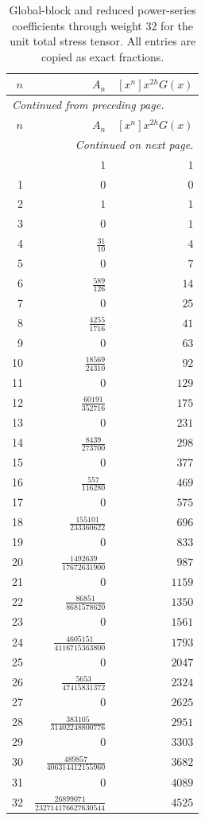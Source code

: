 \begingroup\small
\setlength{\tabcolsep}{5pt}
\begin{longtable}{rrr}
\caption{Global-block and reduced power-series coefficients through weight 32 for the unit total stress tensor. All entries are copied as exact fractions.}\label{expphysics:blocks-unit_total_stress}\\
\toprule
$n$ & $A_n$ & $[x^n]x^{2h}G(x)$\\
\midrule
\endfirsthead
\multicolumn{3}{l}{\small\itshape Continued from preceding page.}\\
\toprule
$n$ & $A_n$ & $[x^n]x^{2h}G(x)$\\
\midrule
\endhead
\midrule
\multicolumn{3}{r}{\small\itshape Continued on next page.}\\
\endfoot
\bottomrule
\endlastfoot
0 & $1$ & $1$\\
1 & $0$ & $0$\\
2 & $1$ & $1$\\
3 & $0$ & $1$\\
4 & $\frac{31}{10}$ & $4$\\
5 & $0$ & $7$\\
6 & $\frac{589}{126}$ & $14$\\
7 & $0$ & $25$\\
8 & $\frac{4255}{1716}$ & $41$\\
9 & $0$ & $63$\\
10 & $\frac{18569}{24310}$ & $92$\\
11 & $0$ & $129$\\
12 & $\frac{60191}{352716}$ & $175$\\
13 & $0$ & $231$\\
14 & $\frac{8439}{273700}$ & $298$\\
15 & $0$ & $377$\\
16 & $\frac{557}{116280}$ & $469$\\
17 & $0$ & $575$\\
18 & $\frac{155101}{233360622}$ & $696$\\
19 & $0$ & $833$\\
20 & $\frac{1492639}{17672631900}$ & $987$\\
21 & $0$ & $1159$\\
22 & $\frac{86851}{8681578620}$ & $1350$\\
23 & $0$ & $1561$\\
24 & $\frac{4605151}{4116715363800}$ & $1793$\\
25 & $0$ & $2047$\\
26 & $\frac{5653}{47415831372}$ & $2324$\\
27 & $0$ & $2625$\\
28 & $\frac{383105}{31402248800776}$ & $2951$\\
29 & $0$ & $3303$\\
30 & $\frac{489857}{406314412155960}$ & $3682$\\
31 & $0$ & $4089$\\
32 & $\frac{26899071}{232714176627630544}$ & $4525$\\
\end{longtable}
\endgroup
